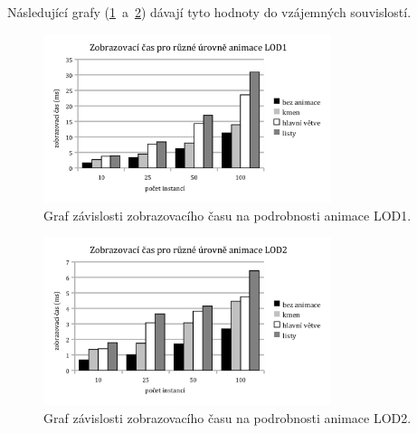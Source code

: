 \pagebreak
Následující grafy (\ref{fig:testANIM1}~a~\ref{fig:testANIM2}) dávají tyto hodnoty do vzájemných souvislostí.
\begin{figure}[!hbt]
\begin{center}
\includegraphics[width=0.75\textwidth]{./graphs/animLOD1.png}
\end{center}
\caption[Graf závislosti zobrazovacího času na podrobnosti animace LOD1]%
{Graf závislosti zobrazovacího času na podrobnosti animace LOD1.\label{fig:testANIM1}
}
\end{figure}
\begin{figure}[!hbt]
\begin{center}
\includegraphics[width=0.75\textwidth]{./graphs/animLOD2.png}
\end{center}
\caption[Graf závislosti zobrazovacího času na podrobnosti animace LOD2]%
{Graf závislosti zobrazovacího času na podrobnosti animace LOD2.\label{fig:testANIM2}
}
\end{figure}


